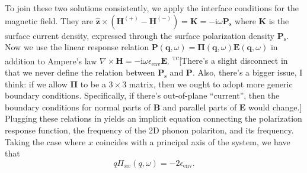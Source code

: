 \documentclass[aps,prb,twocolumn,
	groupedaddress,superscriptaddress,
	amsfonts,amssymb,amsmath,floatfix,
	citeautoscript]{revtex4-1}
\newcommand{\iu}{\mathrm{i}}
\newcommand{\unitvec}[1]{\ensuremath{\hat{\mathbf{#1}}}}
\newcommand{\comment}[2]{\textcolor{blue!70!black}{\small\textsf{\textsuperscript{\textsc{\MakeLowercase{#1}}}[#2]}}}
\begin{document}
To join these two solutions consistently, we apply the interface conditions for the magnetic field. They are $\unitvec{z}\times(\mathbf{H}^{(+)}-\mathbf{H}^{(-)}) = \mathbf{K} = -\iu\omega\mathbf{P}_{\mathrm{s}}$ where $\mathbf{K}$ is the surface current density, expressed through the surface polarization density $\mathbf{P}_{\mathrm{s}}$. 
Now we use the linear response relation $\mathbf{P}(\mathbf{q},\omega) = \boldsymbol{\Pi}(\mathbf{q},\omega)\mathbf{E}(\mathbf{q},\omega)$ in addition to Ampere's law $\nabla\times\mathbf{H} = -\iu\omega\epsilon_{\mathrm{env}}\mathbf{E}$.
	\comment{tc}{There's a slight disconnect in that we never define the relation between $\mathbf{P}_{\mathrm{s}}$ and $\mathbf{P}$. Also, there's a bigger issue, I think: if we allow $\boldsymbol{\Pi}$ to be a $3\times 3$ matrix, then we ought to adopt more generic boundary conditions. Specifically, if there's out-of-plane ``current'', then the boundary conditions for normal parts of $\mathbf{B}$ and parallel parts of $\mathbf{E}$ would change.}
Plugging these relations in yields an implicit equation connecting the polarization response function, the frequency of the 2D phonon polariton, and its frequency. Taking the case where $x$ coincides with a principal axis of the system, we have that 
\begin{equation}\label{eq:2ddispersion}
q\Pi_{xx}(q,\omega)  = -2\epsilon_{\mathrm{env}}.
\end{equation}
\end{document}
